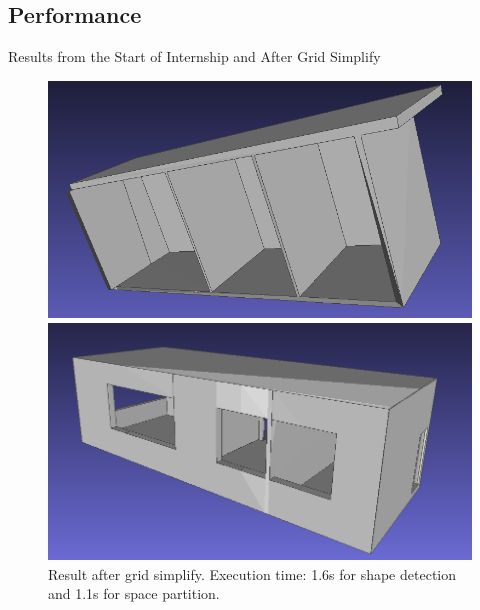 \documentclass[10pt]{beamer}
\begin{document}
\subsection{Performance}
\begin{frame}{Results from the Start of Internship and After Grid Simplify}

    \begin{figure}
      \centering
      
      \begin{minipage}[b]{0.48\textwidth}
        \centering
        \includegraphics[width=\textwidth]{../image/tzones.png}
        \caption{Result from the start of internship. Shape detection took 124s and the kinetic space partition 0.2s. When compared to the size and the complexity of the meeting room mesh, it was kind of disappointing.}
      \end{minipage}\hfill
      
      \begin{minipage}[b]{0.48\textwidth}
        \centering
        \includegraphics[width=\textwidth]{../image/3zones_final.png}
        \caption{Result after grid simplify. Execution time: 1.6s for shape detection and 1.1s for space partition.}
      \end{minipage}
    
    \end{figure}
    
    \end{frame}
\end{document}
